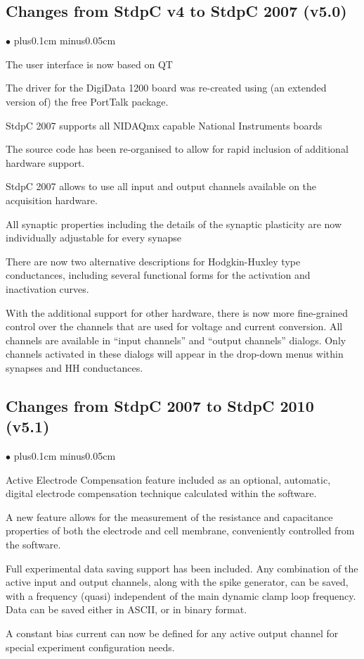 \documentclass{article}
\newenvironment{myitem}{\begin{list}{$\bullet$}{\setlength{\leftmargin}{1.1em}
\itemsep0.1cm plus0.1cm minus0.05cm
\listparindent0cm
\addtolength{\labelsep}{0.5\labelsep}
\setlength{\labelwidth}{0.8em}
\setlength{\leftmargin}{\labelwidth}
\addtolength{\leftmargin}{\labelsep}
}}{\end{list}}
\begin{document}
\subsection{Changes from StdpC v4 to StdpC 2007 (v5.0)}
\begin{myitem}
\item The user interface is now based on QT
\item The driver for the DigiData 1200 board was re-created using (an
  extended version of) the free PortTalk package.
\item StdpC 2007 supports all NIDAQmx capable National Instruments boards
\item The source code has been re-organised to allow for rapid
  inclusion of additional hardware support.
\item StdpC 2007 allows to use all input and output channels available
  on the acquisition hardware.
\item All synaptic properties including the details of the synaptic
  plasticity are now individually adjustable for every synapse
\item There are now two alternative descriptions for Hodgkin-Huxley
  type conductances, including several functional forms for the
  activation and inactivation curves.
\item With the additional support for other hardware, there is now
  more fine-grained control over the channels that are used for
  voltage and current conversion. All channels are available in
  ``input channels'' and ``output channels'' dialogs. Only channels
  activated in these dialogs will appear in the drop-down menus within
  synapses and HH conductances.
\end{myitem}

\subsection{Changes from StdpC 2007 to StdpC 2010 (v5.1)}
\begin{myitem}
\item Active Electrode Compensation feature included as an optional,
  automatic, digital electrode compensation technique calculated within the
  software.                  
\item A new feature allows for the measurement of the resistance and
  capacitance properties of both the electrode and cell membrane,
  conveniently controlled from the software.  
\item Full experimental data saving support has been included. Any
  combination of the active input and output channels, along with the spike generator, can
  be saved, with a frequency (quasi) independent of the main dynamic clamp
  loop frequency. Data can be saved either in ASCII, or in binary format.
\item A constant bias current can now be defined for any active output
  channel for special experiment configuration needs. 
\end{myitem}
\end{document}
